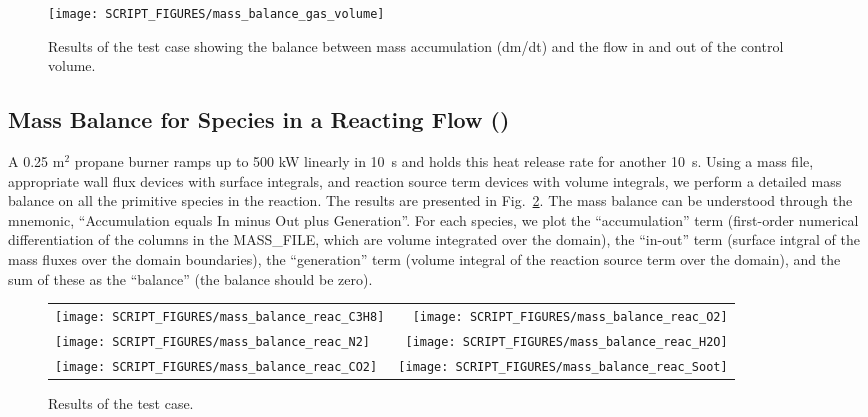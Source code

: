 \documentclass[11pt]{book}
\begin{document}
\begin{figure}[ht]
\centering
\texttt{[image: SCRIPT\_FIGURES/mass\_balance\_gas\_volume]}
\caption[The  test case]{Results of the  test case showing the balance between mass accumulation (dm/dt) and the flow in and out of the control volume.}
\label{fig:mass_balance_gas_volume}
\end{figure}

\subsection{Mass Balance for Species in a Reacting Flow (\texorpdfstring{}{mass\_balance\_reac})}
\label{mass_balance_reac}

A 0.25 m$^2$ propane burner ramps up to 500 kW linearly in 10~s and holds this heat release rate for another 10~s.  Using a mass file, appropriate wall flux devices with surface integrals, and reaction source term devices with volume integrals, we perform a detailed mass balance on all the primitive species in the reaction.  The results are presented in Fig.~\ref{fig:mass_balance_reac}.  The mass balance can be understood through the mnemonic, ``Accumulation equals In minus Out plus Generation''.  For each species, we plot the ``accumulation'' term (first-order numerical differentiation of the columns in the {\ct MASS\_FILE}, which are volume integrated over the domain), the ``in-out'' term (surface intgral of the mass fluxes over the domain boundaries), the ``generation'' term (volume integral of the reaction source term over the domain), and the sum of these as the ``balance'' (the balance should be zero).

\begin{figure}[ht]
\begin{tabular*}{\textwidth}{lr}
\texttt{[image: SCRIPT\_FIGURES/mass\_balance\_reac\_C3H8]} &
\texttt{[image: SCRIPT\_FIGURES/mass\_balance\_reac\_O2]}   \\
\texttt{[image: SCRIPT\_FIGURES/mass\_balance\_reac\_N2]}   &
\texttt{[image: SCRIPT\_FIGURES/mass\_balance\_reac\_H2O]}  \\
\texttt{[image: SCRIPT\_FIGURES/mass\_balance\_reac\_CO2]}  &
\texttt{[image: SCRIPT\_FIGURES/mass\_balance\_reac\_Soot]}
\end{tabular*}
\caption[The  test case]{Results of the  test case.}
\label{fig:mass_balance_reac}
\end{figure}
\end{document}
